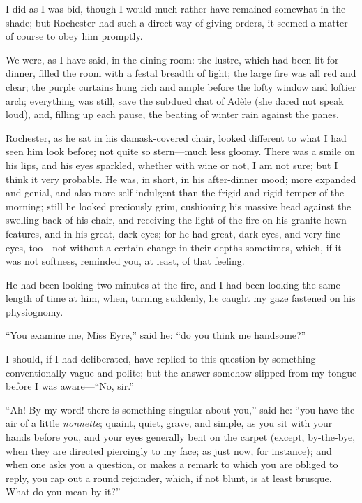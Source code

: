 I did as I was bid, though I would much rather have remained somewhat in
the shade; but \Mr{} Rochester had such a direct way of giving orders, it
seemed a matter of course to obey him promptly.

We were, as I have said, in the dining-room: the lustre, which had been
lit for dinner, filled the room with a festal breadth of light; the
large fire was all red and clear; the purple curtains hung rich and
ample before the lofty window and loftier arch; everything was still,
save the subdued chat of Adèle (she dared not speak loud), and, filling
up each pause, the beating of winter rain against the panes.

\Mr{} Rochester, as he sat in his damask-covered chair, looked different
to what I had seen him look before; not quite so stern---much less
gloomy. There was a smile on his lips, and his eyes sparkled, whether
with wine or not, I am not sure; but I think it very probable. He was,
in short, in his after-dinner mood; more expanded and genial, and also
more self-indulgent than the frigid and rigid temper of the morning;
still he looked preciously grim, cushioning his massive head against the
swelling back of his chair, and receiving the light of the fire on his
granite-hewn features, and in his great, dark eyes; for he had great,
dark eyes, and very fine eyes, too---not without a certain change in
their depths sometimes, which, if it was not softness, reminded you, at
least, of that feeling.

He had been looking two minutes at the fire, and I had been looking the
same length of time at him, when, turning suddenly, he caught my gaze
fastened on his physiognomy.

\enquote{You examine me, Miss Eyre,} said he: \enquote{do you think me
	handsome?}

I should, if I had deliberated, have replied to this question by
something conventionally vague and polite; but the answer somehow
slipped from my tongue before I was aware---\enquote{No, sir.}

\enquote{Ah! By my word! there is something singular about you,} said
he: \enquote{you have the air of a little \emph{nonnette}; quaint, quiet,
	grave, and simple, as you sit with your hands before you, and your eyes
	generally bent on the carpet (except, by-the-bye, when they are directed
	piercingly to my face; as just now, for instance); and when one asks you
	a question, or makes a remark to which you are obliged to reply, you rap
	out a round rejoinder, which, if not blunt, is at least brusque. What
	do you mean by it?}


